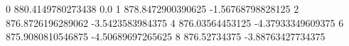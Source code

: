 0 880.4149780273438 0.0
1 878.8472900390625 -1.56768798828125
2 876.8726196289062 -3.5423583984375
4 876.03564453125 -4.37933349609375
6 875.9080810546875 -4.50689697265625
8 876.52734375 -3.88763427734375
